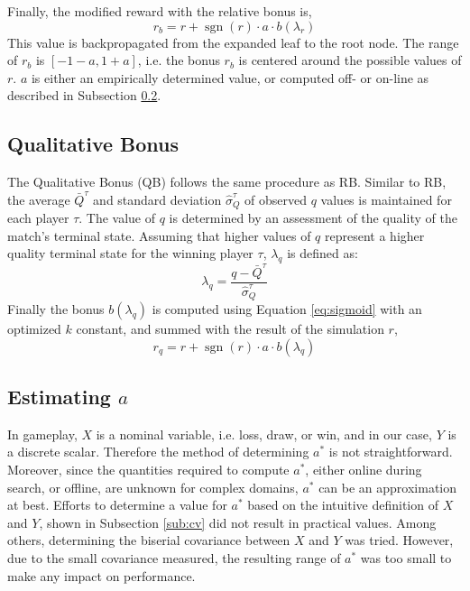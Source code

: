 \documentclass{ecai2014}
\newcommand{\sgn}{\mathop{\mathrm{sgn}}}
\begin{document}
Finally, the modified reward with the relative bonus is, 
\begin{equation}
r_b=r+\sgn(r) \cdot a \cdot b(\lambda_r)
\label{eq:rb}
\end{equation}
This value is backpropagated from the expanded leaf to the root node. The range of $r_b$ is $[-1-a, 1+a]$, i.e. the bonus $r_b$ is centered around the possible values of $r$. $a$ is either an empirically determined value, or computed off- or on-line as described in Subsection \ref{subsec:astar}.

\subsection{Qualitative Bonus}
\label{subsec:qb}
The Qualitative Bonus (QB) follows the same procedure as RB. Similar to RB, the average $\bar{Q}^\tau$ and standard deviation $\hat{\sigma}^\tau_Q$ of observed $q$ values is maintained for each player $\tau$. The value of $q$ is determined by an assessment of the quality of the match's terminal state. Assuming that higher values of $q$ represent a higher quality terminal state for the winning player $\tau$, $\lambda_q$ is defined as:
\begin{equation}
\lambda_q = \frac{q - \bar{Q}^\tau}{\hat{\sigma}^\tau_Q}
\label{eq:qb_norm}
\end{equation}
Finally the bonus $b(\lambda_q)$ is computed using Equation \ref{eq:sigmoid} with an optimized $k$ constant, and summed with the result of the simulation $r$,
\begin{equation}
r_q=r+\sgn(r) \cdot a \cdot b(\lambda_q)
\label{eq:qb}
\end{equation}

\subsection{Estimating $a$}
\label{subsec:astar}
In gameplay, $X$ is a nominal variable, i.e. loss, draw, or win, and in our case, $Y$ is a discrete scalar. Therefore the method of determining $a^*$ is not straightforward. Moreover, since the quantities required to compute $a^*$, either online during search, or offline, are unknown for complex domains, $a^*$ can be an approximation at best. 
Efforts to determine a value for $a^*$ based on the intuitive definition of $X$ and $Y$, shown in Subsection \ref{sub:cv} did not result in practical values. Among others, determining the biserial covariance between $X$ and $Y$ was tried. However, due to the small covariance measured, the resulting range of $a^*$ was too small to make any impact on performance.
\end{document}
